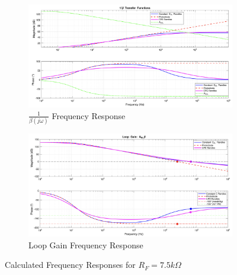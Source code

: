 \begin{figure}[H]
    \centering
    \begin{subfigure}[b]{0.5\textwidth}
        \centering
        \includegraphics[width=\textwidth]{MatLabBeta_7500.png}
        \caption{$\frac{1}{\beta(j\omega)}$ Frequency Response}
        \label{fig:matlab_beta_7.5}
    \end{subfigure}\hfill
    \begin{subfigure}[b]{0.5\textwidth}
        \centering
        \includegraphics[width=\textwidth]{MatLabLG_7500.png}
        \caption{Loop Gain Frequency Response}
        \label{fig:matlab_cl_7.5}
    \end{subfigure}
    \caption{Calculated Frequency Responses for $R_F=7.5k\Omega$}
    \label{fig:matlab_7.5}
\end{figure}

